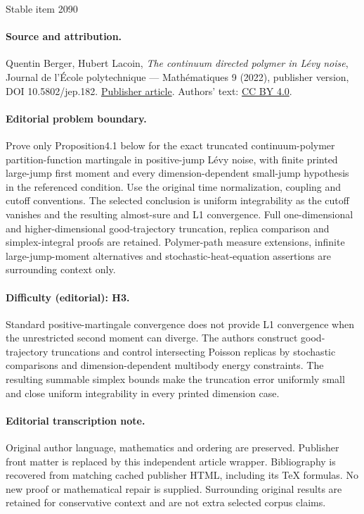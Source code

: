 \documentclass[11pt]{article}
\numberwithin{equation}{section}
\theoremstyle{definition}
\begin{document}
\begin{center}{\Large Stable item 2090}\end{center}
\paragraph{Source and attribution.}
Quentin Berger, Hubert Lacoin, \emph{The continuum directed polymer in Lévy noise}, Journal de l’École polytechnique — Mathématiques 9 (2022), publisher version, DOI 10.5802/jep.182. \href{https://jep.centre-mersenne.org/articles/10.5802/jep.182/}{Publisher article}. Authors' text: \href{https://creativecommons.org/licenses/by/4.0/}{CC BY 4.0}.
\paragraph{Editorial problem boundary.}
Prove only Proposition4.1 below for the exact truncated continuum-polymer partition-function martingale in positive-jump Lévy noise, with finite printed large-jump first moment and every dimension-dependent small-jump hypothesis in the referenced condition. Use the original time normalization, coupling and cutoff conventions. The selected conclusion is uniform integrability as the cutoff vanishes and the resulting almost-sure and L1 convergence. Full one-dimensional and higher-dimensional good-trajectory truncation, replica comparison and simplex-integral proofs are retained. Polymer-path measure extensions, infinite large-jump-moment alternatives and stochastic-heat-equation assertions are surrounding context only.
\paragraph{Difficulty (editorial): H3.}
Standard positive-martingale convergence does not provide L1 convergence when the unrestricted second moment can diverge. The authors construct good-trajectory truncations and control intersecting Poisson replicas by stochastic comparisons and dimension-dependent multibody energy constraints. The resulting summable simplex bounds make the truncation error uniformly small and close uniform integrability in every printed dimension case.
\paragraph{Editorial transcription note.}
Original author language, mathematics and ordering are preserved. Publisher front matter is replaced by this independent article wrapper. Bibliography is recovered from matching cached publisher HTML, including its TeX formulas. No new proof or mathematical repair is supplied. Surrounding original results are retained for conservative context and are not extra selected corpus claims.
\clearpage
\end{document}
